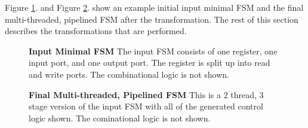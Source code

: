 Figure \ref{fig:initialFSM}. and Figure \ref{fig:finalFSM}. show an example initial input minimal FSM and the final multi-threaded, pipelined FSM after the transformation. The rest of this section describes the transformations that are performed.

\begin{figure}
	\centering
    \caption{{\bf Input Minimal FSM} The input FSM consists of one register, one input port, and one output port. The register is split up into read and write ports. The combinational logic is not shown.}
	\label{fig:initialFSM}
\end{figure}

\begin{figure}
	\centering
    \caption{{\bf Final Multi-threaded, Pipelined FSM} This is a 2 thread, 3 stage version of the input FSM with all of the generated control logic shown. The cominational logic is not shown.}
	\label{fig:finalFSM}
\end{figure}

